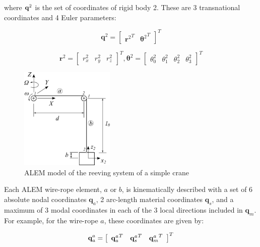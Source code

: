 \setlength{\parindent}{0cm}
where ${{\bf{q}}^{2}}$ is the set of coordinates of rigid body 2. These are 3 transnational coordinates and 4 Euler parameters:

\begin{equation}
    {{\textbf{q}}}^{2} = {\left[ {\begin{array}{*{20}{c}}{\textbf{r}^{2}}^T&{\boldsymbol{\theta}^{2}}^T \end{array}} \right]^T}
\end{equation}

\begin{equation}
  {\textbf{r}}^{2} = {\left[ {\begin{array}{*{20}{c}}{{{r}}_x^{2}}&{{{r}}_y^{2}}&
  {{{r}}_z^{2}} \end{array}} \right]^T},     \boldsymbol{\theta}^{2} = {\left[ {\begin{array}{*{20}{c}}{{\theta_{0}^{2}}}&{{\theta_{1}^{2}}}&{{\theta_{2}^{2}}}&{{\theta_{3}^{2}}}\end{array}} \right]^T}  
\end{equation}

\begin{figure}
    \centering
    \includegraphics[width=0.4\textwidth]{Figures/simpleCrane.png}
    \caption{ALEM model of the reeving system of a simple crane}
    \label{fig:ex_reeving_system}
\end{figure}

Each ALEM wire-rope element, $a$ or $b$, is kinematically described with a set of 6 absolute nodal coordinates $\textbf{q}_a$, 2 arc-length material coordinates $\textbf{q}_s$, and a maximum of 3 modal coordinates in each of the 3 local directions included in $\textbf{q}_m$. For example, for the wire-rope $a$, these coordinates are given by:

\begin{equation}
  {\textbf{q}}_a^{a} = {\left[ {\begin{array}{*{20}{c}}{{{\bf{q}}_a^{a}}^T}&{{{\bf{q}}_s^{a}}^T} & {{{\bf{q}}_m^{a}}^T} \end{array}} \right]^T}
\end{equation}

